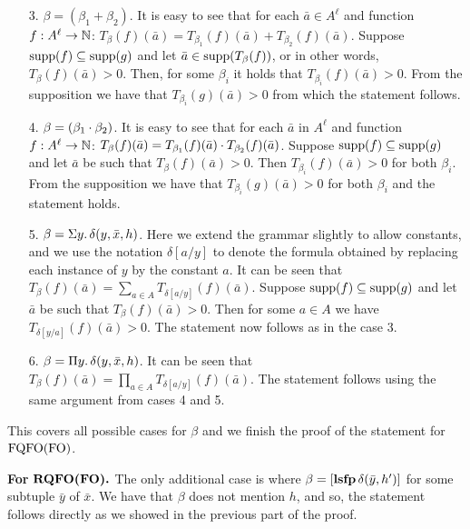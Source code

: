 \begin{itemize}
\item[3.] $\beta = (\beta_1 + \beta_2)$. It is easy to see that for each $\bar{a} \in A^{\ell}$ and function $f:A^{\ell}\to\mathbb{N}$: $T_{\beta}(f)(\bar{a}) = T_{\beta_1}(f)(\bar{a}) + T_{\beta_2}(f)(\bar{a})$. Suppose $\text{\rm supp}(f)\subseteq\text{\rm supp}(g)$ and let $\bar{a} \in \text{\rm supp}(T_{\beta}(f))$, or in other words, $T_{\beta}(f)(\bar{a}) > 0$. Then, for some $\beta_i$ it holds that $T_{\beta_i}(f)(\bar{a}) > 0$. From the supposition we have that $T_{\beta_i}(g)(\bar{a}) > 0$ from which the statement follows.
\item[4.] $\beta = (\beta_1 \cdot \beta_2)$. It is easy to see that for each $\bar{a}$ in $A^{\ell}$ and function $f:A^{\ell}\to\mathbb{N}$: $T_{\beta}(f)(\bar{a}) = T_{\beta_1}(f)(\bar{a}) \cdot T_{\beta_2}(f)(\bar{a})$. Suppose $\text{\rm supp}(f)\subseteq\text{\rm supp}(g)$ and let $\bar{a}$ be such that $T_{\beta}(f)(\bar{a}) > 0$. Then $T_{\beta_i}(f)(\bar{a}) > 0$ for both $\beta_i$. From the supposition we have that $T_{\beta_i}(g)(\bar{a}) > 0$ for both $\beta_i$ and the statement holds.
\item[5.] $\beta = \Sigma{y}.\,\delta(y,\bar{x},h)$. Here we extend the grammar slightly to allow constants, and we use the notation $\delta[a/y]$ to denote the formula obtained by replacing each instance of $y$ by the constant $a$. It can be seen that $T_{\beta}(f)(\bar{a}) = \sum_{a \in A} T_{\delta[a/y]}(f)(\bar{a})$. Suppose $\text{\rm supp}(f)\subseteq\text{\rm supp}(g)$ and let $\bar{a}$ be such that $T_{\beta}(f)(\bar{a}) > 0$. Then for some $a\in A$ we have $T_{\delta[y/a]}(f)(\bar{a}) > 0$. The statement now follows as in the case 3.
\item[6.] $\beta = \Pi{y}.\,\delta(y,\bar{x},h)$. 
It can be seen that $T_{\beta}(f)(\bar{a}) = \prod_{a \in A} T_{\delta[a/y]}(f)(\bar{a})$. 
The statement follows using the same argument from cases 4 and 5.
\end{itemize}
This covers all possible cases for $\beta$ and we finish the proof of the statement for ${\rm FQFO}({\rm FO})$.

\vspace{1em}
{\bf For} $\boldsymbol{{\rm RQFO}({\rm FO}).}$ The only additional case is where $\beta = [{\bf lsfp} \, \delta(\bar{y},h')]$ for some subtuple $\bar{y}$ of $\bar{x}$. We have that $\beta$ does not mention $h$, and so, the statement follows directly as we showed in the previous part of the proof.